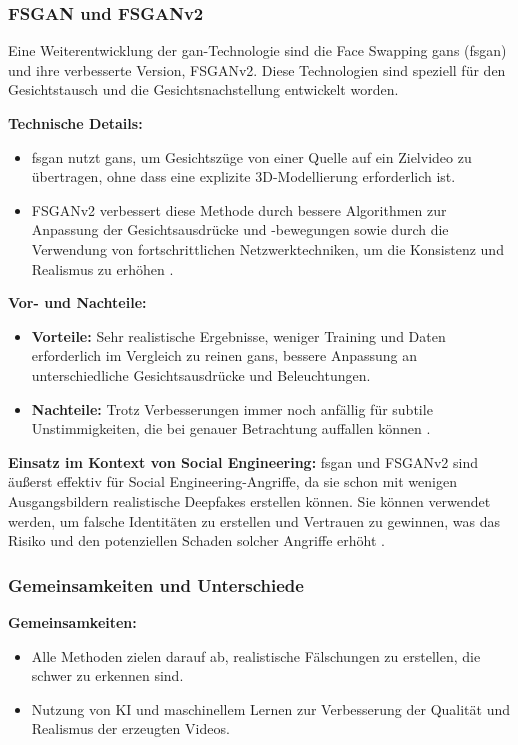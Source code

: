 \subsubsection{FSGAN und FSGANv2}\label{subsubsec:fsgan}

Eine Weiterentwicklung der \gls{gan}-Technologie sind die Face Swapping \glspl{gan} (\gls{fsgan}) und ihre verbesserte Version, FSGANv2.
Diese Technologien sind speziell für den Gesichtstausch und die Gesichtsnachstellung entwickelt worden.

\textbf{Technische Details:}
\begin{itemize}
    \item \gls{fsgan} nutzt \glspl{gan}, um Gesichtszüge von einer Quelle auf ein Zielvideo zu übertragen, ohne dass eine explizite 3D-Modellierung erforderlich ist.
    \item FSGANv2 verbessert diese Methode durch bessere Algorithmen zur Anpassung der Gesichtsausdrücke und -bewegungen sowie durch die Verwendung von fortschrittlichen Netzwerktechniken, um die Konsistenz und Realismus zu erhöhen \cite{fsganv2}.
\end{itemize}

\textbf{Vor- und Nachteile:}
\begin{itemize}
    \item \textbf{Vorteile:} Sehr realistische Ergebnisse, weniger Training und Daten erforderlich im Vergleich zu reinen \glspl{gan}, bessere Anpassung an unterschiedliche Gesichtsausdrücke und Beleuchtungen.
    \item \textbf{Nachteile:} Trotz Verbesserungen immer noch anfällig für subtile Unstimmigkeiten, die bei genauer Betrachtung auffallen können \cite{face-swapping-and-reenactment}.
\end{itemize}

\textbf{Einsatz im Kontext von Social Engineering:} \gls{fsgan} und FSGANv2 sind äußerst effektiv für Social Engineering-Angriffe, da sie schon mit wenigen Ausgangsbildern realistische Deepfakes erstellen können.
Sie können verwendet werden, um falsche Identitäten zu erstellen und Vertrauen zu gewinnen, was das Risiko und den potenziellen Schaden solcher Angriffe erhöht \cite{deepfacelab}.

\subsubsection{Gemeinsamkeiten und Unterschiede}\label{subsubsec:gemeinsamkeiten-unterschiede}

\textbf{Gemeinsamkeiten:}
\begin{itemize}
    \item Alle Methoden zielen darauf ab, realistische Fälschungen zu erstellen, die schwer zu erkennen sind.
    \item Nutzung von KI und maschinellem Lernen zur Verbesserung der Qualität und Realismus der erzeugten Videos.
\end{itemize}

